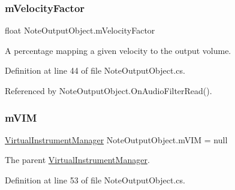 \mbox{\label{group___n_o_o_priv_var_ga84df25e871d69746a7c520f3f8b49a27}} 
\subsubsection{\texorpdfstring{m\+Velocity\+Factor}{mVelocityFactor}}
{\footnotesize\ttfamily float Note\+Output\+Object.\+m\+Velocity\+Factor\hspace{0.3cm}{\ttfamily [private]}}



A percentage mapping a given velocity to the output volume. 



Definition at line 44 of file Note\+Output\+Object.\+cs.



Referenced by Note\+Output\+Object.\+On\+Audio\+Filter\+Read().

\mbox{\label{group___n_o_o_priv_var_ga61394090fddcb90c67bf68f19a5bfb6e}} 
\subsubsection{\texorpdfstring{m\+V\+IM}{mVIM}}
{\footnotesize\ttfamily \hyperlink{class_virtual_instrument_manager}{Virtual\+Instrument\+Manager} Note\+Output\+Object.\+m\+V\+IM = null\hspace{0.3cm}{\ttfamily [private]}}



The parent \hyperlink{class_virtual_instrument_manager}{Virtual\+Instrument\+Manager}. 



Definition at line 53 of file Note\+Output\+Object.\+cs.

